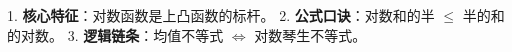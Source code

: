 \begin{summarybox}
1. \textbf{核心特征}：对数函数是上凸函数的标杆。
2. \textbf{公式口诀}：对数和的半 $\leqslant$ 半的和的对数。
3. \textbf{逻辑链条}：均值不等式 $\Leftrightarrow$ 对数琴生不等式。
\end{summarybox}
